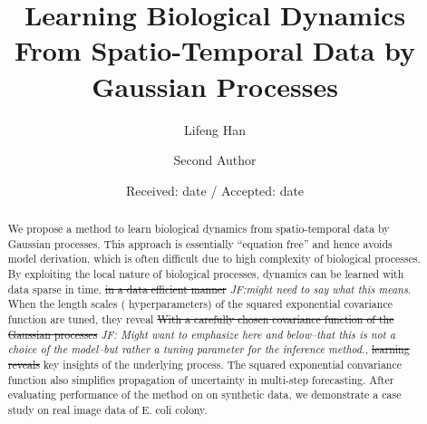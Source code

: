 \documentclass[smallextended,natbib]{svjour3}       %
\begin{document}
\title{Learning Biological Dynamics From Spatio-Temporal Data by Gaussian Processes%
}


\author{Lifeng Han         \and
        Second Author %
}



\date{Received: date / Accepted: date}


\maketitle

\begin{abstract}
We propose a method to learn biological dynamics from spatio-temporal data by Gaussian processes. This approach is essentially ``equation free'' and hence avoids model derivation, which is often difficult due to high complexity of biological processes. By exploiting the local nature of biological processes, dynamics can be learned with data sparse in time. \sout{in a data efficient manner} \emph{JF:might need to say what this means}. When the length scales ( hyperparameters) of the squared exponential covariance function are tuned, they reveal  \sout{With a carefully chosen covariance function of the Gaussian processes} \emph{JF: Might want to emphasize here and below--that this is not a choice of the model--but rather a tuning parameter for the inference method.}, \sout{learning reveals} key insights of the underlying process. The squared exponential convariance function also simplifies propagation of uncertainty in multi-step forecasting. After evaluating performance of the method on on synthetic data, we demonstrate a case study on real image data of E. coli colony.  
\end{abstract}
\end{document}
